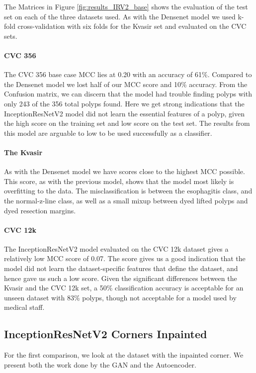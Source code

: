 \noindent
The Matrices in Figure \ref{fig:results_IRV2_base} shows the evaluation of the test set on each of the three datasets used. 
As with the Densenet model we used k-fold cross-validation with six folds for the Kvasir set and evaluated on the CVC sets.

\paragraph{CVC 356}
The CVC 356 base case MCC lies at 0.20 with an accuracy of 61\%.
Compared to the Densenet model we lost half of our MCC score and 10\% accuracy. 
From the Confusion matrix, we can discern that the model had trouble finding polyps with only 243 of the 356 total polyps found. Here we get strong indications that the InceptionResNetV2 model did not learn the essential features of a polyp, given the high score on the training set and low score on the test set.
The results from this model are arguable to low to be used successfully as a classifier.


\paragraph{The Kvasir}
As with the Densenet model we have scores close to the highest MCC possible. This score, as with the previous model, shows that the model most likely is overfitting to the data. 
The misclassification is between the esophagitis class, and the normal-z-line class, as well as a small mixup between dyed lifted polyps and dyed resection margins. 


\paragraph{CVC 12k}
The InceptionResNetV2 model evaluated on the CVC 12k dataset gives a relatively low MCC score of 0.07. The score gives us a good indication that the model did not learn the dataset-specific features that define the dataset, and hence gave us such a low score. Given the significant differences between the Kvasir and the CVC 12k set, a 50\% classification accuracy is acceptable for an unseen dataset with 83\% polyps, though not acceptable for a model used by medical staff.


\subsection{InceptionResNetV2 Corners Inpainted}
For the first comparison, we look at the dataset with the inpainted corner. We present both the work done by the GAN and the Autoencoder. 

